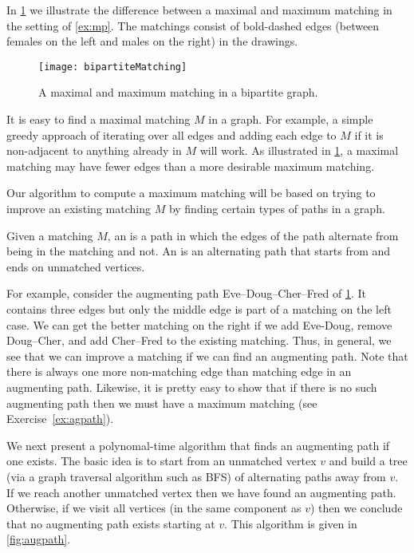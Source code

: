In \cref{fig:matchbipartite} we illustrate the difference between
a maximal and maximum matching in the setting of \cref{ex:mp}.
The matchings consist of bold-dashed edges (between females on the left
and males on the right) in the drawings.

\begin{figure}
\centering
\texttt{[image: bipartiteMatching]}
\caption{A maximal and maximum matching in a bipartite graph.}
\label{fig:matchbipartite}
\end{figure}

It is easy to find a maximal matching $M$ in a graph. For example, 
a simple greedy approach of
iterating over all edges and adding each edge to $M$ if it is
non-adjacent to anything already in $M$ will work.  As illustrated in
\cref{fig:matchbipartite}, a maximal matching may have fewer
edges than a more desirable maximum matching.

Our algorithm to compute a maximum matching will be based on
trying to improve an existing matching $M$ by finding certain
types of paths in a graph.

\begin{Definition}
Given a matching $M$, an  is a path in which 
the edges 
of the path alternate from being in the matching and not.
An  is an alternating path that starts from and ends 
on unmatched vertices.
\end{Definition}

For example, consider the augmenting path Eve--Doug--Cher--Fred of
\cref{fig:matchbipartite}.  It contains three edges but only the
middle edge is part of a matching on the left case.  We can get the
better matching on the right if we add Eve-Doug, remove Doug--Cher, and add 
Cher--Fred to the existing matching.  Thus, in general, we see that we can 
improve a matching if we can find an augmenting path.  Note that there is always one
more non-matching edge than matching edge in an augmenting path.
Likewise, it is pretty easy to show that if there is no such augmenting path 
then we must have a maximum matching (see Exercise~\ref{ex:agpath}).

We next present a polynomal-time algorithm that finds an augmenting path if
one exists.  The basic idea is to start from an unmatched vertex $v$
and build a tree (via a graph traversal algorithm such as BFS) 
of alternating paths away from $v$.  If we reach another unmatched vertex 
then we have found an augmenting path.  Otherwise, if we visit all vertices
(in the same component as $v$) then we conclude that no augmenting 
path exists starting at $v$.  This algorithm is given in \cref{fig:augpath}.


